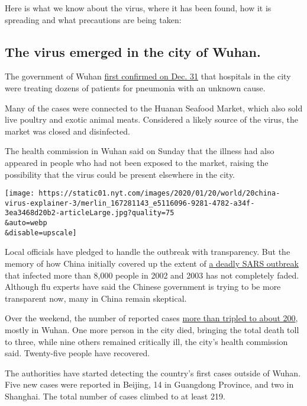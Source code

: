 Here is what we know about the virus, where it has been found, how it is
spreading and what precautions are being taken:

\hypertarget{the-virus-emerged-in-the-city-of-wuhan}{%
\subsection{The virus emerged in the city of
Wuhan.}\label{the-virus-emerged-in-the-city-of-wuhan}}

The government of Wuhan
\href{https://www.nytimes.com/2020/01/06/world/asia/china-SARS-pneumonialike.html}{first
confirmed on Dec. 31} that hospitals in the city were treating dozens of
patients for pneumonia with an unknown cause.

Many of the cases were connected to the Huanan Seafood Market, which
also sold live poultry and exotic animal meats. Considered a likely
source of the virus, the market was closed and disinfected.

The health commission in Wuhan said on Sunday that the illness had also
appeared in people who had not been exposed to the market, raising the
possibility that the virus could be present elsewhere in the city.

\texttt{[image: https://static01.nyt.com/images/2020/01/20/world/20china-virus-explainer-3/merlin\_167281143\_e5116096-9281-4782-a34f-3ea3468d20b2-articleLarge.jpg?quality=75\\\&auto=webp\\\&disable=upscale]}

Local officials have pledged to handle the outbreak with transparency.
But the memory of how China initially covered up the extent of
\href{https://www.nytimes.com/2003/04/27/world/the-sars-epidemic-the-path-from-china-s-provinces-a-crafty-germ-breaks-out.html}{a
deadly SARS outbreak} that infected more than 8,000 people in 2002 and
2003 has not completely faded. Although flu experts have said the
Chinese government is trying to be more transparent now, many in China
remain skeptical.

Over the weekend, the number of reported cases
\href{https://www.nytimes.com/2020/01/18/world/asia/china-virus-wuhan-coronavirus.html}{more
than tripled to about 200}, mostly in Wuhan. One more person in the city
died, bringing the total death toll to three, while nine others remained
critically ill, the city's health commission said. Twenty-five people
have recovered.

The authorities have started detecting the country's first cases outside
of Wuhan. Five new cases were reported in Beijing, 14 in Guangdong
Province, and two in Shanghai. The total number of cases climbed to at
least 219.

